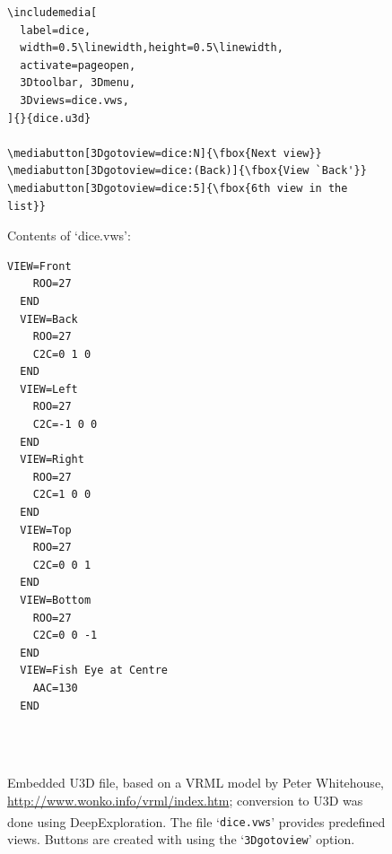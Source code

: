 \documentclass[a4paper]{article}
\begin{document}
\begin{figure}[bp]
\begin{Verbatim}[fontsize=\footnotesize]
\includemedia[
  label=dice,	
  width=0.5\linewidth,height=0.5\linewidth,
  activate=pageopen,
  3Dtoolbar, 3Dmenu,
  3Dviews=dice.vws,
]{}{dice.u3d}

\mediabutton[3Dgotoview=dice:N]{\fbox{Next view}}
\mediabutton[3Dgotoview=dice:(Back)]{\fbox{View `Back'}}
\mediabutton[3Dgotoview=dice:5]{\fbox{6th view in the list}}
\end{Verbatim}
\vspace{1ex}
Contents of `dice.vws':
\begin{Verbatim}[fontsize=\footnotesize]
  VIEW=Front
    ROO=27
  END
  VIEW=Back
    ROO=27
    C2C=0 1 0
  END
  VIEW=Left
    ROO=27
    C2C=-1 0 0
  END
  VIEW=Right
    ROO=27
    C2C=1 0 0
  END
  VIEW=Top
    ROO=27
    C2C=0 0 1
  END
  VIEW=Bottom
    ROO=27
    C2C=0 0 -1
  END
  VIEW=Fish Eye at Centre
    AAC=130
  END
\end{Verbatim}
\centering
{}\quad\parbox[t]{0.4\linewidth}{%
\\
\\
}
\caption{Embedded U3D file, based on a VRML model by Peter Whitehouse, \url{http://www.wonko.info/vrml/index.htm}; conversion to U3D was done using DeepExploration\textsuperscript{\scriptsize\textregistered}\cite{dexp}. The file `{\tt dice.vws}' provides predefined views. Buttons are created with {\tt\string\mediabutton} using the `{\tt 3Dgotoview}' option.}\label{u3dex}
\end{figure}
\end{document}
